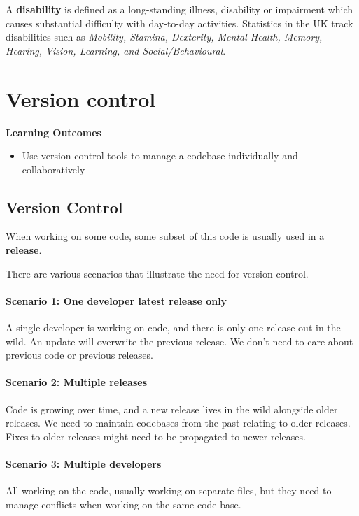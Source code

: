 A \textbf{disability} is defined as a long-standing illness, disability or impairment which causes substantial difficulty with day-to-day activities. Statistics in the UK track disabilities such as \emph{Mobility, Stamina, Dexterity, Mental Health, Memory, Hearing, Vision, Learning, and Social/Behavioural}. 

\section{Version control}
\begin{mdframed}
\textbf{Learning Outcomes}
\begin{itemize}[label={\checkmark}]
\item Use version control tools to manage a codebase individually and collaboratively
\end{itemize}
\end{mdframed}

\subsection{Version Control}

When working on some code, some subset of this code is usually used in a \textbf{release}. 

There are various scenarios that illustrate the need for version control.

\paragraph{Scenario 1: One developer latest release only} A single developer is working on code, and there is only one release out in the wild. An update will overwrite the previous release. We don't need to care about previous code or previous releases.

\paragraph{Scenario 2: Multiple releases} Code is growing over time, and a new release lives in the wild alongside older releases. We need to maintain codebases from the past relating to older releases. Fixes to older releases might need to be propagated to newer releases.

\paragraph{Scenario 3: Multiple developers} All working on the code, usually working on separate files, but they need to manage conflicts when working on the same code base.

